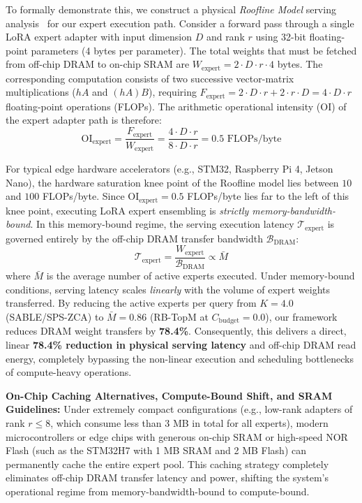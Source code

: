 To formally demonstrate this, we construct a physical \emph{Roofline Model} serving analysis~\citep{williams2009roofline} for our expert execution path. Consider a forward pass through a single LoRA expert adapter with input dimension $D$ and rank $r$ using 32-bit floating-point parameters (4 bytes per parameter). The total weights that must be fetched from off-chip DRAM to on-chip SRAM are $W_{\text{expert}} = 2 \cdot D \cdot r \cdot 4$ bytes. The corresponding computation consists of two successive vector-matrix multiplications ($h A$ and $(h A) B$), requiring $F_{\text{expert}} = 2 \cdot D \cdot r + 2 \cdot r \cdot D = 4 \cdot D \cdot r$ floating-point operations (FLOPs). The arithmetic operational intensity (OI) of the expert adapter path is therefore:
\begin{equation}
\text{OI}_{\text{expert}} = \frac{F_{\text{expert}}}{W_{\text{expert}}} = \frac{4 \cdot D \cdot r}{8 \cdot D \cdot r} = 0.5 \text{ FLOPs/byte}
\label{eq:operational_intensity}
\end{equation}

For typical edge hardware accelerators (e.g., STM32, Raspberry Pi 4, Jetson Nano), the hardware saturation knee point of the Roofline model lies between $10$ and $100$ FLOPs/byte. Since $\text{OI}_{\text{expert}} = 0.5$ FLOPs/byte lies far to the left of this knee point, executing LoRA expert ensembling is \emph{strictly memory-bandwidth-bound}. In this memory-bound regime, the serving execution latency $\mathcal{T}_{\text{expert}}$ is governed entirely by the off-chip DRAM transfer bandwidth $\mathcal{B}_{\text{DRAM}}$:
\begin{equation}
\mathcal{T}_{\text{expert}} = \frac{W_{\text{expert}}}{\mathcal{B}_{\text{DRAM}}} \propto \bar{M}
\label{eq:memory_latency}
\end{equation}
where $\bar{M}$ is the average number of active experts executed. Under memory-bound conditions, serving latency scales \emph{linearly} with the volume of expert weights transferred. By reducing the active experts per query from $K=4.0$ (SABLE/SPS-ZCA) to $\bar{M}=0.86$ (RB-TopM at $C_{\text{budget}} = 0.0$), our framework reduces DRAM weight transfers by \textbf{78.4\%}. Consequently, this delivers a direct, linear \textbf{78.4\% reduction in physical serving latency} and off-chip DRAM read energy, completely bypassing the non-linear execution and scheduling bottlenecks of compute-heavy operations.

\textbf{On-Chip Caching Alternatives, Compute-Bound Shift, and SRAM Guidelines:} Under extremely compact configurations (e.g., low-rank adapters of rank $r \le 8$, which consume less than 3 MB in total for all experts), modern microcontrollers or edge chips with generous on-chip SRAM or high-speed NOR Flash (such as the STM32H7 with 1 MB SRAM and 2 MB Flash) can permanently cache the entire expert pool. This caching strategy completely eliminates off-chip DRAM transfer latency and power, shifting the system's operational regime from memory-bandwidth-bound to compute-bound. 

